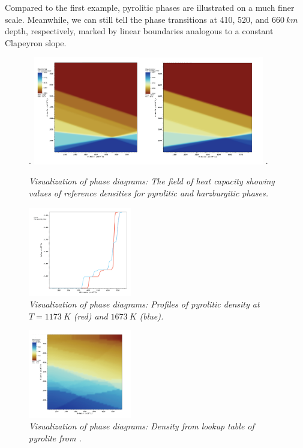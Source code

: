 Compared to the first example, pyrolitic phases are illustrated on a much finer scale.  %
Meanwhile, we can still tell the phase transitions at 410, 520, and $\SI{660}{km}$ depth, respectively, marked by linear boundaries analogous to a constant Clapeyron slope.


\begin{figure}
\phantom.
\hfill
\includegraphics[width=0.9\textwidth]{cookbooks/visualizing_phase_diagram/doc/pyrolite_harzburgite.png}
\hfill
\phantom.
\caption{\it Visualization of phase diagrams: The field of heat capacity showing values of reference densities for pyrolitic and harzburgitic phases.}
\label{fig:phase_diagram_ph_density}
\end{figure}

\begin{figure}
\centering
\includegraphics[width=0.4\textwidth]{cookbooks/visualizing_phase_diagram/doc/pyrolite_linear.png}
\caption{\it Visualization of phase diagrams: Profiles of pyrolitic density at $T=\SI{1173}{K}$ (red) and $\SI{1673}{K}$ (blue).}
\label{fig:phase_diagram_ph_profile}
\end{figure}
\begin{figure}
\centering
\includegraphics[width=0.4\textwidth]{cookbooks/visualizing_phase_diagram/doc/steinberg.png}
\caption{\it Visualization of phase diagrams: Density from lookup table of pyrolite from \cite{stixrude2011thermodynamics}.} %
\label{fig:phase_diagram_steinberg_density}
\end{figure}
